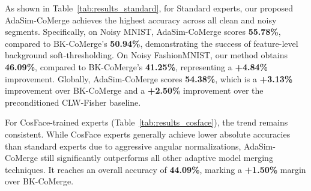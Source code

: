 \documentclass{article}
\theoremstyle{plain}
\theoremstyle{definition}
\theoremstyle{remark}
\begin{document}
\begin{table}[t]
\centering
\caption{Test-Time Model Merging accuracy (\%) across non-stationary stream segments using CosFace experts.}
\label{tab:results_cosface}
\end{table}

As shown in Table~\ref{tab:results_standard}, for Standard experts, our proposed AdaSim-CoMerge achieves the highest accuracy across all clean and noisy segments. Specifically, on Noisy MNIST, AdaSim-CoMerge scores \textbf{55.78\%}, compared to BK-CoMerge's \textbf{50.94\%}, demonstrating the success of feature-level background soft-thresholding. On Noisy FashionMNIST, our method obtains \textbf{46.09\%}, compared to BK-CoMerge's \textbf{41.25\%}, representing a \textbf{+4.84\%} improvement. Globally, AdaSim-CoMerge scores \textbf{54.38\%}, which is a \textbf{+3.13\%} improvement over BK-CoMerge and a \textbf{+2.50\%} improvement over the preconditioned CLW-Fisher baseline.

For CosFace-trained experts (Table~\ref{tab:results_cosface}), the trend remains consistent. While CosFace experts generally achieve lower absolute accuracies than standard experts due to aggressive angular normalizations, AdaSim-CoMerge still significantly outperforms all other adaptive model merging techniques. It reaches an overall accuracy of \textbf{44.09\%}, marking a \textbf{+1.50\%} margin over BK-CoMerge.
\end{document}
